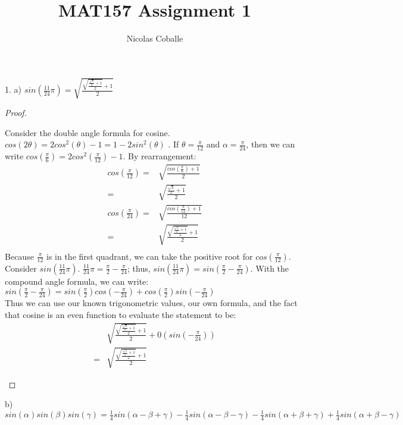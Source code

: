 \documentclass[11pt]{article}
\title{MAT157 Assignment 1}
\author{Nicolas Coballe}
\newcommand{\bproof}{\begin{proof}
$ $ \\
\begin{adjustwidth}{3em}{0pt}
}
\newcommand{\eproof}{\end{adjustwidth}
\end{proof}}
\begin{document}
\maketitle
\begin{flushleft}

1. a) $sin(\frac{11}{24} \pi) = \sqrt{\frac{\sqrt{\frac{\frac{\sqrt{3}}{2} + 1}{2}} + 1}{2}}$

\bproof
Consider the double angle formula for cosine. $cos(2 \theta ) = 2cos^2( \theta)-1 = 1 - 2sin^2( \theta)$  . If $ \theta = \frac{\pi}{12}$ and $ \alpha = \frac{\pi}{24}$, then we can write $cos(\frac{\pi}{6}) = 2cos^2(\frac{\pi}{12})-1$. By rearrangement:
\begin{align*}
cos( \frac{\pi}{12}) = & \sqrt{\frac{cos(\frac{\pi}{6}) + 1}{2}} \\
= &\sqrt{\frac{\frac{\sqrt{3}}{2} + 1}{2}} \\
cos( \frac{\pi}{24}) = & \sqrt{\frac{cos(\frac{\pi}{12}) + 1}{12}} \\
= &\sqrt{\frac{\sqrt{\frac{\frac{\sqrt{3}}{2} + 1}{2}} + 1}{2}} \\
\end{align*}
Because $\frac{\pi}{12}$ is in the first quadrant, we can take the positive root for $cos( \frac{\pi}{12})$.\\
\bigskip
Consider $sin( \frac{11}{24} \pi )$. $\frac{11}{24} \pi = \frac{\pi}{2} - \frac{\pi}{24}$; thus, $sin( \frac{11}{24} \pi ) = sin(\frac{\pi}{2} - \frac{\pi}{24})$. With the compound angle formula, we can write: \\
$sin( \frac{\pi}{2} - \frac{\pi}{24} ) = sin( \frac{\pi}{2} )cos (- \frac{\pi}{24}) + cos( \frac{\pi}{2} )sin (- \frac{\pi}{24})$ \\
Thus we can use our known trigonometric values, our own formula, and the fact that cosine is an even function to evaluate the statement to be: \\
\begin{align*}
 & \sqrt{\frac{\sqrt{\frac{\frac{\sqrt{3}}{2} + 1}{2}} + 1}{2}} + 0(sin(- \frac{\pi}{24})) \\
=& \sqrt{\frac{\sqrt{\frac{\frac{\sqrt{3}}{2} + 1}{2}} + 1}{2}}
\end{align*}

\eproof

b) $sin(\alpha)sin(\beta)sin(\gamma) = \frac{1}{4}sin( \alpha - \beta + \gamma) - \frac{1}{4}sin( \alpha - \beta - \gamma) - \frac{1}{4}sin( \alpha + \beta + \gamma) + \frac{1}{4}sin( \alpha + \beta - \gamma)$


\end{flushleft}
\end{document}
